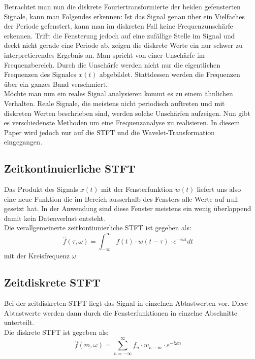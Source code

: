 Betrachtet man nun die diskrete Fouriertransformierte der beiden gefensterten Signale, kann man Folgendes erkennen: Ist das Signal genau über ein Vielfaches der Periode gefenstert, kann man im diskreten Fall keine Frequenzunschärfe erkennen. Trifft die Fensterung jedoch auf eine zufällige Stelle im Signal und deckt nicht gerade eine Periode ab, zeigen die diskrete Werte ein nur schwer zu interpretierendes Ergebnis an. Man spricht von einer Unschärfe im Frequenzbereich. Durch die Unschärfe werden nicht nur die eigentlichen Frequenzen des Signales $x(t)$ abgebildet. Stattdessen werden die Frequenzen über ein ganzes Band verschmiert.\\

Möchte man nun ein reales Signal analysieren kommt es zu einem ähnlichen Verhalten. Reale Signale, die meistens nicht periodisch auftreten und mit diskreten Werten beschrieben sind, werden solche Unschärfen aufzeigen. Nun gibt es verschiedenste Methoden um eine Frequenzanalyse zu realisieren. In diesem Paper wird jedoch nur auf die STFT und die Wavelet-Transformation eingegangen. 


\subsection{Zeitkontinuierliche STFT}

Das Produkt des Signals $x(t)$ mit der Fensterfunktion $w(t) $ liefert uns also eine neue Funktion die im Bereich ausserhalb des Fensters alle Werte auf null gesetzt hat. In der Anwendung sind diese Fenster meistens ein wenig überlappend damit kein Datenverlust entsteht. \\
Die verallgemeinerte zeitkontiunierliche STFT ist  gegeben als:
\begin{equation}
	\hat{f}(\tau, \omega)=\int_{-\infty}^{\infty} f(t)\cdot w(t-\tau)\cdot e^{-i \omega t} dt
\end{equation}
mit der Kreisfrequenz  $\omega $

\subsection{Zeitdiskrete STFT}
Bei der zeitdiskreten STFT liegt das Signal in einzelnen Abtastwerten vor. Diese Abtastwerte werden dann durch die Fensterfunktionen in einzelne Abschnitte unterteilt. \\
Die diskrete STFT ist gegeben als:
\begin{equation}
	\hat{f}(m, \omega)=\sum_{n=-\infty}^{\infty} f_{n} \cdot w_{n-m}\cdot e^{-i \omega n}
\end{equation}


